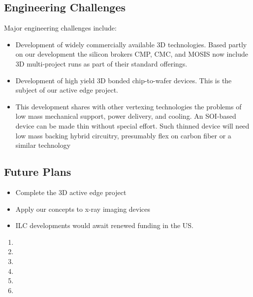 \subsection{Engineering Challenges}
Major  engineering challenges include:
\begin{itemize}
\item Development of widely commercially available 3D technologies.  Based partly on our development the silicon brokers CMP, CMC, and MOSIS now include 3D multi-project runs as part of their standard offerings.
\item Development of high yield 3D bonded chip-to-wafer devices.  This is the subject of our active edge project.
\item This development shares with other vertexing technologies the problems of low mass mechanical support, power delivery, and cooling. An SOI-based device can be made thin without special effort. Such thinned device will need low mass backing hybrid circuitry, presumably flex on carbon fiber or a similar technology
\end{itemize}

\subsection{Future Plans}
\begin{itemize}
\item Complete the 3D active edge project
\item Apply our concepts to x-ray imaging devices
\item ILC developments would await renewed funding in the US.
\end{itemize}


\begin{enumerate}
\item {}
\item {}
\item {}
\item {}
\item {}
\item {}
\end{enumerate}
